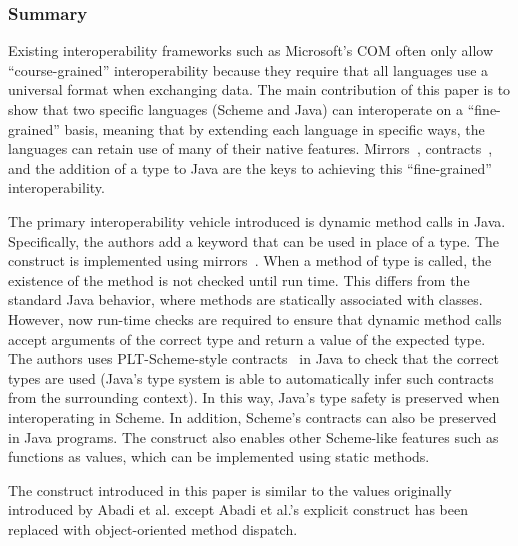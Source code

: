 \documentclass[letterpaper]{llncs}
\begin{document}
\subsubsection*{Summary}
Existing interoperability frameworks such as Microsoft's COM often only allow ``course-grained'' interoperability because they require that all languages use a universal format when exchanging data. The main contribution of this paper is to show that two specific languages (Scheme and Java) can interoperate on a ``fine-grained'' basis, meaning that by extending each language in specific ways, the languages can retain use of many of their native features. Mirrors~\cite{Bracha2004Mirrors}, contracts~\cite{Findler2002Contracts}, and the addition of a \dynamic type to Java are the keys to achieving this ``fine-grained'' interoperability.

The primary interoperability vehicle introduced is dynamic method calls in Java. Specifically, the authors add a \dynamic keyword that can be used in place of a type. The \dynamic construct is implemented using mirrors~\cite{Bracha2004Mirrors}. When a method of type \dynamic is called, the existence of the method is not checked until run time. This differs from the standard Java behavior, where methods are statically associated with classes. However, now run-time checks are required to ensure that dynamic method calls accept arguments of the correct type and return a value of the expected type. The authors uses PLT-Scheme-style contracts~\cite{Findler2002Contracts} in Java to check that the correct types are used (Java's type system is able to automatically infer such contracts from the surrounding context). In this way, Java's type safety is preserved when interoperating in Scheme. In addition, Scheme's contracts can also be preserved in Java programs. The \dynamic construct also enables other Scheme-like features such as functions as values, which can be implemented using \dynamic static methods.

The \dynamic construct introduced in this paper is similar to the \Dynamic values originally introduced by Abadi et al. except Abadi et al.'s explicit \typecase construct has been replaced with object-oriented method dispatch.




\end{document}
